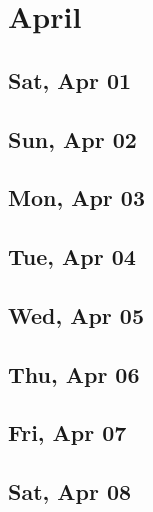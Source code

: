 \chapter{April}
	\section{Sat, Apr 01}
		
		
	\section{Sun, Apr 02}
		
		
	\section{Mon, Apr 03}
		
		
	\section{Tue, Apr 04}
		
		
	\section{Wed, Apr 05}
		
		
	\section{Thu, Apr 06}
		
		
	\section{Fri, Apr 07}
		
		
	\section{Sat, Apr 08}
		
		
